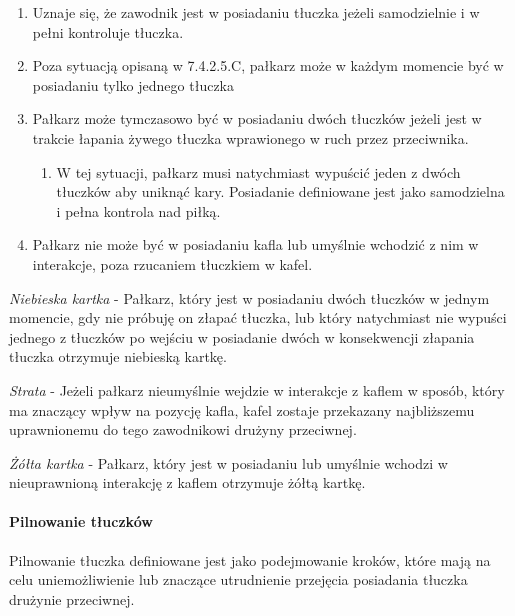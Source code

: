 \documentclass[12pt]{article}
\begin{document}
\begin{enumerate}
	\item
	      Uznaje się, że zawodnik jest w posiadaniu tłuczka jeżeli samodzielnie
	      i w pełni kontroluje tłuczka.
	\item
	      Poza sytuacją opisaną w 7.4.2.5.C, pałkarz może w każdym momencie być
	      w posiadaniu tylko jednego tłuczka
	\item
	      Pałkarz może tymczasowo być w posiadaniu dwóch tłuczków jeżeli jest w
	      trakcie łapania żywego tłuczka wprawionego w ruch przez przeciwnika.

	      \begin{enumerate}
		      \item
		            W tej sytuacji, pałkarz musi natychmiast wypuścić jeden z dwóch
		            tłuczków aby uniknąć kary. Posiadanie definiowane jest jako
		            samodzielna i pełna kontrola nad piłką.
	      \end{enumerate}
	\item
	      Pałkarz nie może być w posiadaniu kafla lub umyślnie wchodzić z nim w
	      interakcje, poza rzucaniem tłuczkiem w kafel.
\end{enumerate}

\emph{Niebieska kartka} - Pałkarz, który jest w posiadaniu dwóch
tłuczków w jednym momencie, gdy nie próbuję on złapać tłuczka, lub który
natychmiast nie wypuści jednego z tłuczków po wejściu w posiadanie dwóch
w konsekwencji złapania tłuczka otrzymuje niebieską kartkę.

\emph{Strata} - Jeżeli pałkarz nieumyślnie wejdzie w interakcje z kaflem
w sposób, który ma znaczący wpływ na pozycję kafla, kafel zostaje
przekazany najbliższemu uprawnionemu do tego zawodnikowi drużyny
przeciwnej.

\emph{Żółta kartka} - Pałkarz, który jest w posiadaniu lub umyślnie
wchodzi w nieuprawnioną interakcję z kaflem otrzymuje żółtą kartkę.

\paragraph{Pilnowanie tłuczków}
Pilnowanie tłuczka definiowane
jest jako podejmowanie kroków, które mają na celu uniemożliwienie lub
znaczące utrudnienie przejęcia posiadania tłuczka drużynie przeciwnej.
\end{document}

